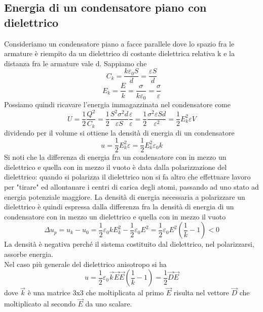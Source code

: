 \documentclass[10pt,a4paper]{article}
\begin{document}
\subsection{Energia di un condensatore piano con dielettrico}
Consideriamo un condensatore piano a facce parallele dove lo spazio fra le armature è riempito da un dielettrico di costante dielettrica relativa k e la distanza fra le armature vale d. Sappiamo che
\[C_k = \frac{k\varepsilon_0 S}{d} = \frac{\varepsilon S}{d}\]
\[E_k = \frac{E}{k} = \frac{\sigma}{k\varepsilon_0} = \frac{\sigma}{\varepsilon}\]
Possiamo quindi ricavare l'energia immagazzinata nel condensatore come
\[U = \frac{1}{2}\frac{Q^2}{C_k} = \frac{1}{2}\frac{S^2\sigma^2 d}{\varepsilon S}\frac{\varepsilon}{\varepsilon} = \frac{1}{2}\frac{\sigma^2\varepsilon S d}{\varepsilon^2} = \frac{1}{2}E_k^2\varepsilon V\]
dividendo per il volume si ottiene la densità di energia di un condensatore
\[u = \frac{1}{2}E_k^2\varepsilon  = \frac{1}{2}E_k^2\varepsilon_0 k\]
Si noti che la differenza di energia fra un condensatore con in mezzo un dielettrico e quella con in mezzo il vuoto è data dalla polarizzazione del dielettrico: quando si polarizza il dielettrico non si fa altro che effettuare lavoro per "tirare" ed allontanare i centri di carica degli atomi, passando ad uno stato ad energia potenziale maggiore. La densità di energia necessaria a polarizzare un dielettrico è quindi espressa dalla differenza fra la densità di energia di un condensatore con in mezzo un dielettrico e quella con in mezzo il vuoto
\[\Delta u_p = u_k-u_0 = \frac{1}{2}\varepsilon_0 kE_k^2-\frac{1}{2}\varepsilon_0 E^2 = \frac{1}{2}\varepsilon_0 E^2(\frac{1}{k}-1)<0 \]
La densità è negativa perché il sistema costituito dal dielettrico, nel polarizzarsi, assorbe energia.\\
Nel caso più generale del dielettrico anisotropo si ha 
\[u = \frac{1}{2}\varepsilon_0 \vec{k} \vec{E} \vec{E}(\frac{1}{k}-1) =\frac{1}{2} \vec{D} \vec{E}\]
dove $\vec{k}$ è una matrice 3x3 che moltiplicata al primo $\vec{E}$ risulta nel vettore $\vec{D}$ che moltiplicato al secondo $\vec{E}$ da uno scalare.
\end{document}
